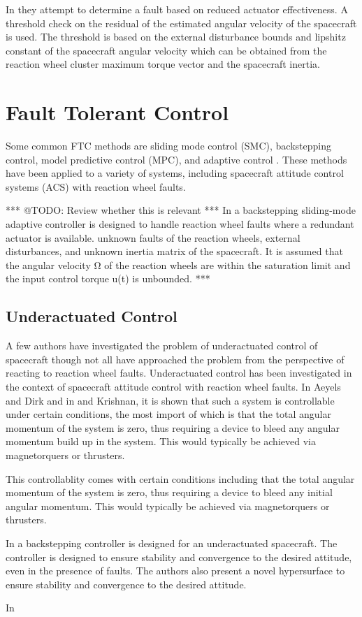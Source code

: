 In \cite{shenActiveFaulttolerantControl2019} they attempt to determine a fault based on reduced actuator effectiveness. A threshold check on the residual of the estimated angular velocity of the spacecraft is used. The threshold is based on the external disturbance bounds and lipshitz constant of the spacecraft angular velocity which can be obtained from the reaction wheel cluster maximum torque vector and the spacecraft inertia. 


\section{Fault Tolerant Control}

Some common FTC methods are sliding mode control (SMC), backstepping control, model predictive control (MPC), and adaptive control \cite{yinReviewRecentDevelopment2016}. These methods have been applied to a variety of systems, including spacecraft attitude control systems (ACS) with reaction wheel faults.


*** @TODO: Review whether this is relevant ***
In \cite{jiangAdaptiveBacksteppingFaulttolerant2010} a backstepping sliding-mode adaptive controller is designed to handle reaction wheel faults where a redundant actuator is available. unknown faults of the reaction wheels, external disturbances, and unknown inertia matrix of the spacecraft. It is assumed that the angular velocity Ω of the reaction wheels are within the saturation limit and the input control torque u(t) is unbounded.
***

\subsection{Underactuated Control}
\label{underactuated_lit_review}
A few authors have investigated the problem of underactuated control of spacecraft though not all have approached the problem from the perspective of reacting to reaction wheel faults. Underactuated control has been investigated in the context of spacecraft attitude control with reaction wheel faults. In \cite{aeyelsStabilizationNonLinear}  Aeyels and Dirk and in and \cite{krishnanAttitudeStabilizationRigid1994} Krishnan, it is shown that such a system is controllable under certain conditions, the most import of which is that the total angular momentum of the system is zero, thus requiring a device to bleed any angular momentum build up in the system. This would typically be achieved via magnetorquers or thrusters. 

This controllablity comes with certain conditions including that the total angular momentum of the system is zero, thus requiring a device to bleed any initial angular momentum. This would typically be achieved via magnetorquers or thrusters.

In \cite{nadafiRobustBacksteppingAttitude2021} a backstepping controller is designed for an underactuated spacecraft. The controller is designed to ensure stability and convergence to the desired attitude, even in the presence of faults. The authors also present a novel hypersurface to ensure stability and convergence to the desired attitude.

In \cite{zarouratiUnderactuatedFaultTolerantControl}